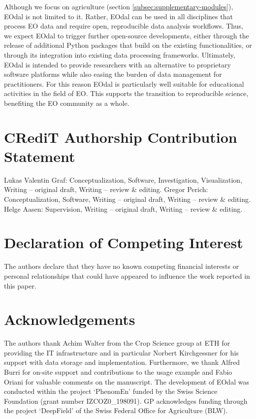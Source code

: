 Although we focus on agriculture (section \ref{subsec:supplementary-modules}), EOdal is not limited to it. Rather, EOdal can be used in all disciplines that process EO data and require open, reproducible data analysis workflows. Thus, we expect EOdal to trigger further open-source developments, either through the release of additional Python packages that build on the existing functionalities, or through its integration into existing data processing frameworks. Ultimately, EOdal is intended to provide researchers with an alternative to proprietary software platforms while also easing the burden of data management for practitioners. For this reason EOdal is particularly well suitable for educational activities in the field of EO. This supports the transition to reproducible science, benefiting the EO community as a whole.

\section*{CRediT Authorship Contribution Statement}
Lukas Valentin Graf: Conceptualization, Software, Investigation, Visualization, Writing – original draft, Writing – review \& editing. Gregor Perich: Conceptualization, Software, Writing – original draft, Writing – review \& editing. Helge Aasen: Supervision, Writing – original draft, Writing – review \& editing.

\section*{Declaration of Competing Interest}
The authors declare that they have no known competing financial interests or personal relationships that could have appeared to influence the work reported in this paper.

\section*{Acknowledgements}
The authors thank Achim Walter from the Crop Science group at ETH for providing the IT infrastructure and in particular Norbert Kirchgessner for his support with data storage and implementation. Furthermore, we thank Alfred Burri for on-site support and contributions to the usage example and Fabio Oriani for valuable comments on the manuscript. The development of EOdal was conducted within the project `PhenomEn' funded by the Swiss Science Foundation (grant number IZCOZ0\_198091). GP acknowledges funding through the project `DeepField' of the Swiss Federal Office for Agriculture (BLW). 
